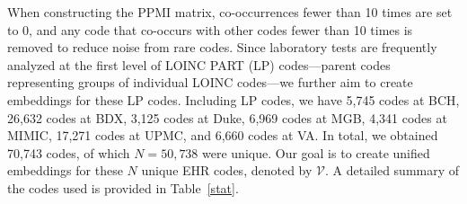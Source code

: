 \documentclass{article}
\begin{document}
\def\Vsc{\mathcal{V}}

When constructing the PPMI matrix, co-occurrences fewer than 10 times are set to 0, and any code that co-occurs with other codes fewer than 10 times is removed to reduce noise from rare codes. Since laboratory tests are frequently analyzed at the first level of LOINC PART (LP) codes—parent codes representing groups of individual LOINC codes—we further aim to create embeddings for these LP codes. Including LP codes, we have 5,745 codes at BCH, 26,632 codes at BDX, 3,125 codes at Duke, 6,969 codes at MGB, 4,341 codes at MIMIC, 17,271 codes at UPMC, and 6,660 codes at VA. In total, we obtained 70,743 codes, of which \( N = 50,738 \) were unique. Our goal is to create unified embeddings for these \( N \) unique EHR codes, denoted by \(\mathcal{V}\). A detailed summary of the codes used is provided in Table~\ref{stat}.

\begin{table}
\footnotesize
    \centering
    \caption{ Types of EHR codes studied across the $7$ institutions. BCH $=$ Boston Children’s Hospital, BDX $=$  Bordeaux University Hospital, Duke $=$ Duke Clinical Research Datamart, MGB $=$ Mass General Brigham, MIMIC $=$ Medical Information Mart for Intensive Care IV, UPMC $=$ University of Pittsburgh Medical Center, and VA $=$ Veteran Affairs healthcare system. }
    \label{stat}
\end{table}
\end{document}
